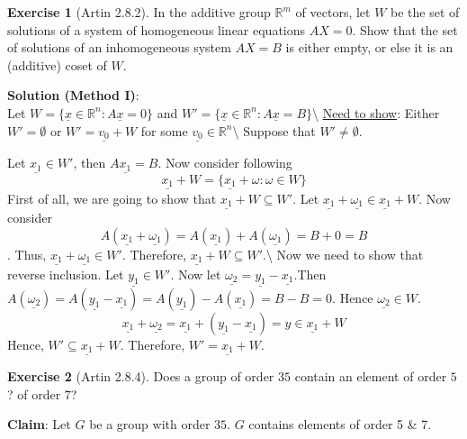 \documentclass[
]{book}
\theoremstyle{definition}
\theoremstyle{definition}
\theoremstyle{definition}
\newtheorem{exercise}{Exercise}[chapter]
\theoremstyle{definition}
\theoremstyle{remark}
\begin{document}
\begin{exercise}[Artin 2.8.2]
\protect\hypertarget{exr:unnamed-chunk-166}{}\label{exr:unnamed-chunk-166}In the additive group \(\mathbb{R}^m\) of vectors, let \(W\) be the set of solutions of a system of homogeneous linear equations \(AX = 0\). Show that the set of solutions of an inhomogeneous system \(AX = B\) is either empty, or else it is an (additive) coset of \(W\).
\end{exercise}

\textbf{Solution (Method I)}:\\
Let \(W=\{\underline{x}\in\mathbb{R}^n:A\underline{x}=0\}\)
and \(W'=\{\underline{x}\in\mathbb{R}^n:A\underline{x}=B\}\)\textbackslash{}
\underline{Need to show}: Either \(W'=\emptyset\) or \(W'=\underline{v_0} +W\) for some \(\underline{v_0}\in \mathbb{R}^n\)\textbackslash{}
Suppose that \(W'\neq \emptyset\).

Let \(\underline{x_1}\in W'\), then \(A\underline{x_1}=B\).
Now consider following \[\underline{x_1}+W=\{\underline{x_1}+\omega:\omega\in W\}\]
First of all, we are going to show that \(\underline{x_1}+W \subseteq W'\).
Let \(\underline{x_1}+\underline{\omega_1}\in \underline{x_1}+W\). Now consider
\[A(\underline{x_1}+\underline{\omega_1})=A(\underline{x_1})+A(\underline{\omega_1})=B+0=B\].
Thus, \(\underline{x_1}+\underline{\omega_1}\in W'\). Therefore, \(\underline{x_1}+W\subseteq W'\).\textbackslash{}
Now we need to show that reverse inclusion.
Let \(\underline{y_1}\in W'\). Now let \(\underline{\omega_2}=\underline{y_1}-\underline{x_1}\).Then
\(A(\underline{\omega_2})=A(\underline{y_1}-\underline{x_1})=A(\underline{y_1})-A(\underline{x_1})=B-B=0\). Hence \(\underline{\omega_2}\in W\).
\[ \underline{x_1}+\underline{\omega_2}=\underline{x_1}+(\underline{y_1}-\underline{x_1}) =y \in  \underline{x_1}+W \]
Hence, \(W'\subseteq \underline{x_1}+W\). Therefore, \(W'=\underline{x_1}+W\).

\begin{exercise}[Artin 2.8.4]
\protect\hypertarget{exr:unnamed-chunk-167}{}\label{exr:unnamed-chunk-167}Does a group of order \(35\) contain an element of order \(5\)? of order \(7\)?
\end{exercise}

\textbf{Claim}: Let \(G\) be a group with order \(35\). \(G\) contains elements of order 5 \& 7.
\end{document}

